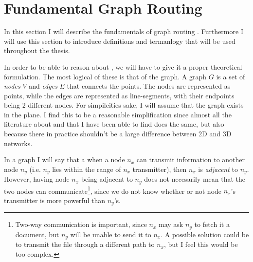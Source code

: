 \section{Fundamental Graph Routing}
\label{fundamental}
In this section I will describe the fundamentals of graph routing   . Furthermore I will use this section to introduce definitions and termanlogy that will be used throughout the thesis.

In order to be able to reason about \manet, we will have to give it a proper theoretical formulation. The most logical of these is that of the graph. A graph $G$ is a set of \emph{nodes} $V$ and \emph{edges} $E$ that connects the points. The nodes are represented as points, while the edges are represented as line-segments, with their endpoints being 2 different nodes. For simpilcities sake, I will assume that the graph exists in the plane. I find this to be a reasonable simplification since almost all the literature about \manet and \anet that I have been able to find does the same, but also because there in practice shouldn't be a large difference between 2D and 3D networks. 

In a graph I will say that a when a node $n_x$ can transmit information to another node $n_y$ (i.e. $n_y$ lies within the range of $n_x$ transmitter), then $n_x$ is \emph{adjacent} to $n_y$. However, having node $n_x$ being adjacent to $n_y$ does not necesarily mean that the two nodes can communicate\footnote{Two-way communication is important, since $n_x$ may ask $n_y$ to fetch it a document, but $n_y$ will be unable to send it to $n_x$. A possible solution could be to transmit the file through a different path to $n_x$, but I feel this would be too complex.}, since we do not know whether or not node $n_x$'s transmitter is more powerful than $n_y$'s.   








